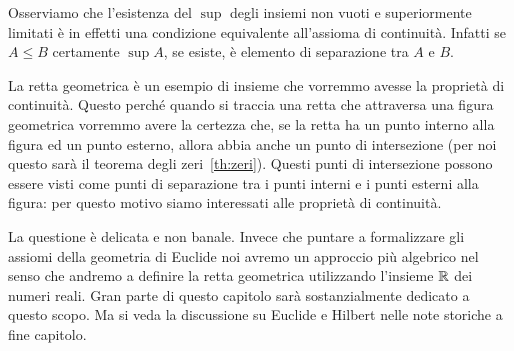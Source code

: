 Osserviamo che l'esistenza del $\sup$
degli insiemi non vuoti e superiormente limitati
è in effetti una condizione equivalente all'assioma di continuità.
Infatti se $A\le B$ certamente $\sup A$, se esiste, è elemento 
di separazione tra $A$ e $B$.

La retta geometrica è un esempio di insieme che 
vorremmo avesse la proprietà di continuità.
Questo perché quando si traccia una retta che attraversa una figura 
geometrica vorremmo avere la certezza che, 
se la retta ha un punto interno alla figura ed un punto esterno, 
allora abbia anche un punto di intersezione (per noi questo sarà il teorema 
degli zeri~\ref{th:zeri}).
Questi punti di intersezione possono essere  
visti come punti di separazione tra i punti
interni e i punti esterni alla figura:
per questo motivo siamo interessati alle proprietà di continuità.

La questione è delicata e non banale. 
Invece che puntare a formalizzare gli assiomi della geometria di Euclide
noi avremo un approccio più algebrico nel senso che andremo a definire 
la retta geometrica utilizzando l'insieme ${\mathbb R}$ dei numeri reali.
Gran parte di questo capitolo sarà sostanzialmente dedicato a questo scopo.
Ma si veda la discussione su Euclide e Hilbert nelle note storiche 
a fine capitolo.

